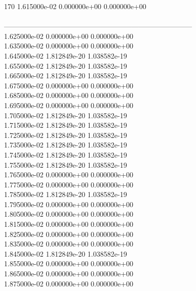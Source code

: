170	1.615000e-02	0.000000e+00	0.000000e+00	\\ \hline
\\ \hline
--------------------------------------------------------------------------------\\ 	1.625000e-02	0.000000e+00	0.000000e+00	\\ 	1.635000e-02	0.000000e+00	0.000000e+00	\\ 	1.645000e-02	1.812849e-20	1.038582e-19	\\ 	1.655000e-02	1.812849e-20	1.038582e-19	\\ 	1.665000e-02	1.812849e-20	1.038582e-19	\\ 	1.675000e-02	0.000000e+00	0.000000e+00	\\ 	1.685000e-02	0.000000e+00	0.000000e+00	\\ 	1.695000e-02	0.000000e+00	0.000000e+00	\\ 	1.705000e-02	1.812849e-20	1.038582e-19	\\ 	1.715000e-02	1.812849e-20	1.038582e-19	\\ 	1.725000e-02	1.812849e-20	1.038582e-19	\\ 	1.735000e-02	1.812849e-20	1.038582e-19	\\ 	1.745000e-02	1.812849e-20	1.038582e-19	\\ 	1.755000e-02	1.812849e-20	1.038582e-19	\\ 	1.765000e-02	0.000000e+00	0.000000e+00	\\ 	1.775000e-02	0.000000e+00	0.000000e+00	\\ 	1.785000e-02	1.812849e-20	1.038582e-19	\\ 	1.795000e-02	0.000000e+00	0.000000e+00	\\ 	1.805000e-02	0.000000e+00	0.000000e+00	\\ 	1.815000e-02	0.000000e+00	0.000000e+00	\\ 	1.825000e-02	0.000000e+00	0.000000e+00	\\ 	1.835000e-02	0.000000e+00	0.000000e+00	\\ 	1.845000e-02	1.812849e-20	1.038582e-19	\\ 	1.855000e-02	0.000000e+00	0.000000e+00	\\ 	1.865000e-02	0.000000e+00	0.000000e+00	\\ 	1.875000e-02	0.000000e+00	0.000000e+00	\\ \hline
